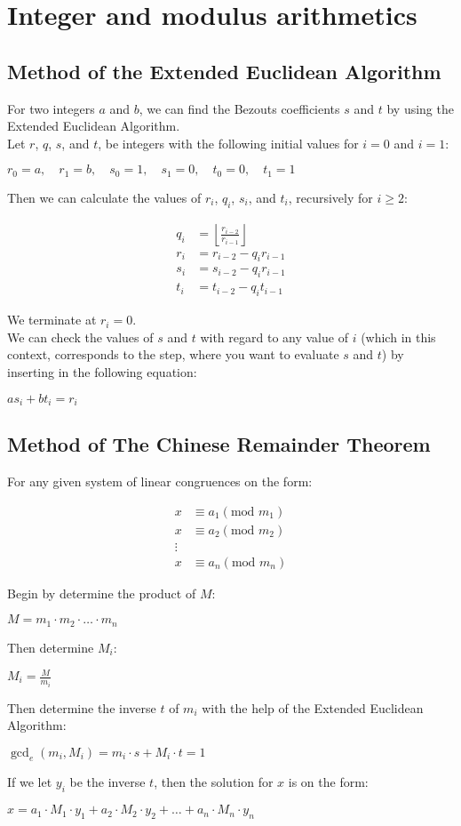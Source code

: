 \documentclass{report}
\newcommand{\cent}[1]{\begin{center}#1\end{center}}
\newcommand{\mAlign}[1]{\begin{align*}#1\end{align*}}
\newcommand{\Floor}[1]{\left \lfloor{#1}\right \rfloor }
\begin{document}
	\section{Integer and modulus arithmetics}
	\subsection{Method of the Extended Euclidean Algorithm}
	
	For two integers $a$ and $b$, we can find the Bezouts coefficients $s$ and $t$ by using the Extended Euclidean Algorithm.\\
	
	Let $r$, $q$, $s$, and $t$, be integers with the following initial values for $i=0$ and  $i=1$:
	
	
	\cent{$r_0 = a, \quad r_1 = b, \quad s_0 = 1, \quad s_1 = 0, \quad t_0 = 0, \quad t_1 = 1$}
	
	Then we can calculate the values of $r_i$, $q_i$, $s_i$, and $t_i$, recursively for $i \geq 2$:
	
	\mAlign{q_i &= \Floor{\frac{r_{i-2}}{r_{i-1}}} \\
				  r_i &= r_{i-2} - q_i r_{i-1} \\
			  	  s_i &= s_{i-2} - q_i r_{i-1} \\
		  	  	  t_i &= t_{i-2} - q_i t_{i-1}}
	
	We terminate at $r_i = 0$.\\
	
	We can check the values of $s$ and $t$ with regard to any value of $i$ (which in this context, corresponds to the step, where you want to evaluate $s$ and $t$) by inserting in the following equation:
	
	\cent{$as_i+bt_i=r_i$}
	\subsection{Method of The Chinese Remainder Theorem}
	
	For any given system of linear congruences on the form:
	
	\mAlign{x &\equiv a_1 (\text{mod } m_1)\\
				 x &\equiv a_2(\text{mod } m_2) \\
			 	 \vdots \\
		 	  	 x &\equiv a_n(\text{mod } m_n)}
	 
	Begin by determine the product of $M$:
	 
	\cent{$M = m_1 \cdot m_2 \cdot \hdots \cdot m_n $}
	 
	Then determine $M_i$:
	
	\cent{$M_i = \frac{M}{m_i}$}
	
	Then determine the inverse $t$ of $m_i$ with the help of the Extended Euclidean Algorithm:
	
	\cent{$\gcd_e(m_i,M_i) =m_i \cdot s + M_i \cdot t= 1$}
	
	If we let $y_i$ be the inverse $t$, then the solution for $x$ is on the form:
	 
	\cent{$x = a_1\cdot M_1 \cdot y_1 + a_2\cdot M_2 \cdot y_2 + \hdots + a_n\cdot M_n \cdot y_n  $}
	
	
\end{document}
